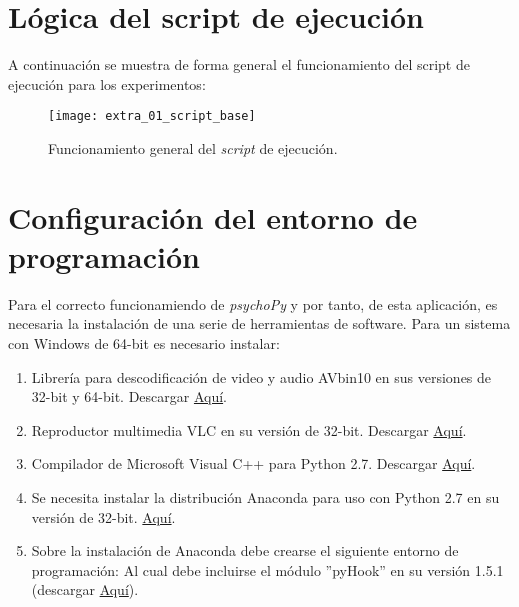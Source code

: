 \documentclass[\main/main.tex]{subfiles}
\begin{document}
	\chapter{Lógica del script de ejecución}
	\label{cha:a01_script}
		A continuación se muestra de forma general el funcionamiento del script de ejecución para los experimentos:
		\begin{figure}[H]
            \centering
            \texttt{[image: extra\_01\_script\_base]}
            \caption{Funcionamiento general del \textit{script} de ejecución.}
            \label{fig:a01_script}
        \end{figure} 

	\chapter{Configuración del entorno de programación}
	\label{cha:a02_install}
		Para el correcto funcionamiendo de \textit{psychoPy} y por tanto, de esta aplicación, es necesaria la instalación de una serie de herramientas de software. Para un sistema con Windows de 64-bit es necesario instalar:
		\begin{enumerate}\setlength\itemsep{-0.5em}		
			\item Librería para descodificación de video y audio AVbin10 en sus versiones de 32-bit y 64-bit. Descargar \href{http://avbin.github.io/AVbin/Download.html}{Aquí}. 
			\item Reproductor multimedia VLC en su versión de 32-bit. Descargar \href{https://www.videolan.org/vlc/download-windows.es.html}{Aquí}. 
			\item Compilador de Microsoft Visual C++ para Python 2.7. Descargar \href{https://www.microsoft.com/en-us/download/details.aspx?id=44266}{Aquí}. 
			\item Se necesita instalar la distribución Anaconda para uso con Python 2.7 en su versión de 32-bit. \href{https://www.anaconda.com/download/#download}{Aquí}. 
			\item Sobre la instalación de Anaconda debe crearse el siguiente entorno de programación: 
			Al cual debe incluirse el módulo ''pyHook'' en su versión 1.5.1 (descargar \href{https://www.lfd.uci.edu/~gohlke/pythonlibs/#pyhook}{Aquí}). 
		\end{enumerate}
\end{document}
